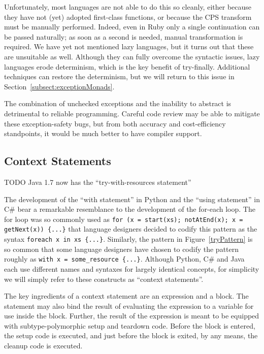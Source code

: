 \documentclass[11pt]{article}
\newcommand{\maybePage}{\newpage}
\begin{document}
Unfortunately, most languages are not able to do this so cleanly, either because they have not (yet) adopted first-class functions, or because the CPS transform must be manually performed.
Indeed, even in Ruby only a single continuation can be passed naturally; as soon as a second is needed, manual transformation is required.
We have yet not mentioned lazy languages, but it turns out that these are unsuitable as well.
Although they can fully overcome the syntactic issues, lazy languages erode determinism, which is the key benefit of try-finally.
Additional techniques can restore the determinism, but we will return to this issue in Section~\ref{subsect:exceptionMonads}.

The combination of unchecked exceptions and the inability to abstract is detrimental to reliable programming.
Careful code review may be able to mitigate these exception-safety bugs, but from both accuracy and cost-efficiency standpoints, it would be much better to have compiler support.


\maybePage
\subsection{Context Statements}
\label{context statements}

TODO Java 1.7 now has the ``try-with-resources statement''

The development of the ``with statement'' in Python and the ``using statement'' in C\# bear a remarkable resemblance to the development of the for-each loop.
The for loop was so commonly used as \texttt{for (x = start(xs); notAtEnd(x); x = getNext(x)) \{...\}} that language designers decided to codify this pattern as the syntax \texttt{foreach x in xs \{...\}}.
Similarly, the pattern in Figure~\ref{tryPattern} is so common that some language designers have chosen to codify the pattern roughly as \texttt{with x = some\_resource \{...\}}.
Although Python, C\# and Java each use different names and syntaxes for largely identical concepts, for simplicity we will simply refer to these constructs as ``context statements''.

The key ingredients of a context statement are an expression and a block.
The statement may also bind the result of evaluating the expression to a variable for use inside the block.
Further, the result of the expression is meant to be equipped with subtype-polymorphic setup and teardown code.
Before the block is entered, the setup code is executed, and just before the block is exited, by any means, the cleanup code is executed.\cite{PEP343}\cite{cSharpStandard}
\end{document}
